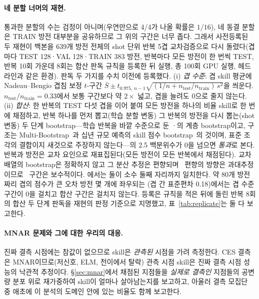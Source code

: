 \documentclass[10pt,a4paper]{article}
\begin{document}
\paragraph{네 분할 너머의 재현.}
통과한 분할의 수는 검정이 아니며(우연만으로 4/4가 나올 확률은 $1/16$), 네 동결
분할은 TRAIN 방전 대부분을 공유하므로 그 위의 구간은 너무 좁다. 그래서 사전등록된
두 재현이 백본을 639개 방전 전체의 shot 단위 반복 5겹 교차검증으로 다시
돌렸다(겹마다 TEST 128·VAL 128·TRAIN 383 방전, 반복마다 모든 방전이 한 번씩 TEST,
반복 10회 가운데 8회는 합산 판독 규칙을 등록한 뒤 실행, 총 100회 GPU 실행, 헤드라인과 같은 환경). 판독 두 가지를
수치 이전에 등록했다. (i) \emph{겹 수준}: 겹 skill 평균에 Nadeau--Bengio 겹침 보정
$t$-구간 $\bar S \pm t_{0.975,\,n-1}\sqrt{(1/n + n_{\mathrm{test}}/n_{\mathrm{train}})\,s^{2}}$을
씌운다\citep{Nadeau2003Inference}. $n_{\mathrm{test}}/n_{\mathrm{train}} = 0.33$에서
보통 구간보다 약 $2\times$ 넓고, 겹을 늘려도 0으로 줄지
않는다\citep{Bates2024CrossValidation}. (ii) \emph{합산}: 한 반복의 TEST 다섯 겹을
이어 붙여 모든 방전을 하나의 비율 skill로 한 번에 채점하고, 반복 하나를 먼저
뽑고(학습 분할 변동) 그 반복의 방전을 다시 뽑는(shot 변동) 두 단계 bootstrap---학습
반복을 바깥 수준으로 둔 \citet{Saravanan2020Hierarchical}·\citet{Ren2010Nonparametric}의
계층 bootstrap이고, 구조는 Multi-Bootstrap~\citep{Sellam2022MultiBERTs}과 십년 규모
예측의 skill 점수 bootstrap~\citep{Goddard2013Verification}의 것이며, 표준 조각의
결합이지 새것으로 주장하지 않는다---의 2.5 백분위수가 0을 넘으면 \emph{통과}로 본다.
반복과 방전은 교차 요인으로 재표집된다(모든 방전이 모든 반복에서 채점된다). 교차 배열의
bootstrap은 정확하지 않고 그 분산 추정은 편향되며~\citep{Gallas2009Framework} 편향의
방향은 과대추정이므로~\citep{Owen2007Pigeonhole} 구간은 보수적이다. \Ti{}에서는 둘이
소수 둘째 자리까지
일치한다. 약 80개 방전짜리 겹의 점수가 큰 오차 방전 몇 개에 좌우되는
\Vrot{}(겹 간 표준편차 0.18)에서는 겹 수준 구간이 0을 걸치고 합산 구간은 걸치지
않는다. 등록은 규칙을 적은 뒤에 돌린 반복 8회의 합산 두 단계 판독을 재현의 판정
기준으로 지명했고, 표~\ref{tab:replicate}는 둘 다 보고한다.

\paragraph{MNAR 문제와 그에 대한 우리의 대응.}
진짜 결측 시점에는 참값이 없으므로 skill은 \emph{관측된} 시점을 가려 측정한다.
CES 결측은 MNAR이므로(저신호, ELM, 천이에서 탈락) 관측 시점 skill은 진짜 결측
시점 성능의 낙관적 추정이다. \S\ref{sec:mnar}에서 채점된 지점들을 \emph{실제로
결측인} 지점들의 공변량 분포 위로 재가중하여 skill이 얼마나 살아남는지를
보고하고, 아울러 결측 모집단 중 애초에 이 분석의 도메인 안에 있는 비율도 함께
보고한다.
\end{document}
